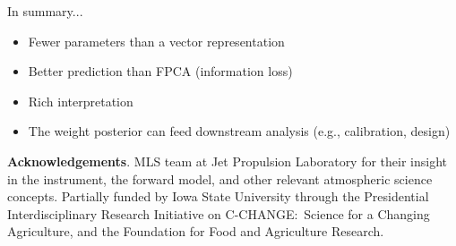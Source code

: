 \documentclass[final]{beamer}
\newlength{\sepwidth}
\newlength{\colwidth}
\newcommand{\separatorcolumn}{\begin{column}{\sepwidth}\end{column}}
\begin{document}
\begin{frame}[t]
{\begin{minipage}[t][76cm][t]{58cm}
\begin{minipage}[t]{1.0\linewidth}
\begin{minipage}[t]{.5\linewidth}
\begin{block}{In summary...}
            \begin{itemize}
            \item Fewer parameters than a vector representation
            \item Better prediction than FPCA (information loss)
            \item Rich interpretation
            \item The weight posterior can feed downstream analysis (e.g.,
              calibration, design)
            \end{itemize}
          \end{block}
        \end{minipage}
      \end{minipage}
    \end{minipage}%
  }
  \colorbox{black}{
    \begin{minipage}[t][76cm][t]{3cm}
    \end{minipage}%
  }

  \begin{minipage}[t][5cm][t]{116cm}
    \textbf{Acknowledgements}. MLS team at Jet Propulsion
    Laboratory for their insight in the instrument, the forward model, and other
    relevant atmospheric science concepts.
    Partially funded by Iowa State University through the
    Presidential Interdisciplinary Research Initiative on C-CHANGE:~Science
    for a Changing Agriculture, and the Foundation for Food and Agriculture
    Research.
  \end{minipage}

















\end{frame}
\end{document}
